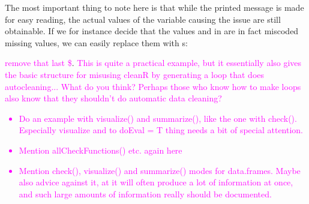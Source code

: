 \documentclass[article]{jss}
\newcommand{\hl}[1]{\textcolor{magenta}{#1}}
\newcommand{\R}[1]{\code{#1}}
\begin{document}
\begin{Schunk}
\end{Schunk}
The most important thing to note here is that while the printed message is made for easy reading, the actual values of the variable causing the issue are still obtainable. If we for instance decide that the values \R{999} and \R{NaN} in \R{var2} are in fact miscoded missing values, we can easily replace them with \R{NA}s:
\begin{Schunk}
\begin{Sinput}
> toyData$var2[toyData$var2 %
> identifyMissing(toyData$var2}
\end{Sinput}
\end{Schunk}
\hl{remove that last \$}. \hl{This is quite a practical example, but it essentially also gives the basic structure for misusing cleanR by generating a loop that does autocleaning... What do you think? Perhaps those who know how to make loops also know that they shouldn't do automatic data cleaning?}

\hl{
\begin{itemize}
\item Do an example with visualize() and summarize(), like the one with check(). Especially visualize and to doEval = T thing needs a bit of special attention.
\item  Mention allCheckFunctions() etc. again here
\item Mention check(), visualize() and summarize() modes for data.frames. Maybe also advice against it, at it will often produce a lot of information at once, and such large amounts of information really should be documented.
\end{itemize}
}
\end{document}
